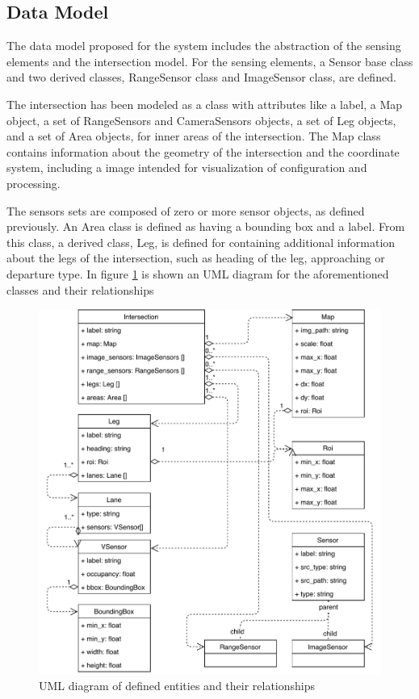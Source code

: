\subsection{Data Model}

The data model proposed for the system includes the abstraction of the sensing elements and the intersection model. For the sensing elements, a Sensor base class and two derived classes, RangeSensor class and ImageSensor class, are defined. 

The intersection has been modeled as a class with attributes like a label, a Map object, a set of RangeSensors and CameraSensors objects, a set of Leg objects, and a set of Area objects, for inner areas of the intersection. The Map class contains information about the geometry of the intersection and the coordinate system, including a image intended for visualization of configuration and processing.

The sensors sets are composed of zero or more sensor objects, as defined previously. An Area class is defined as having a bounding box and a label. From this class, a derived class, Leg, is defined for containing additional information about the legs of the intersection, such as heading of the leg, approaching or departure type. In figure \ref{data_model} is shown an UML diagram for the aforementioned classes and their relationships

\begin{figure}[ht!]
\centering
\includegraphics[scale=0.75]{fig/3/data_modelA.pdf}
\caption{UML diagram of defined entities and their relationships}
\label{data_model}
\end{figure}

